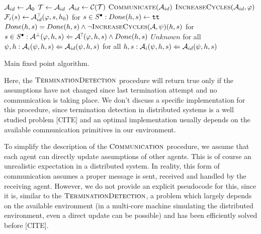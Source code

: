 \begin{algorithm}
	\begin{algorithmic}[1]
		\State $\mathcal{A}_{id} \gets \mathcal{A}_0$
		\Repeat
		\Repeat
		\Repeat
		\State $\mathcal{T} \gets \mathcal{A}_{id}$
		\State $\mathcal{A}_{id} \gets \mathcal{C}(\mathcal{T})$
		\State $\Call{Communicate}{\assume_{id}}$
		\State $\Call{IncreaseCycles}{\assume_{id}, \varphi}$
		\State $\mathcal{F}_i(s) \gets \mathcal{A}^\top_{id}(\varphi, s, h_0)$
		\EndFunction
			\State for $s \in \mathit{S}^\bullet : Done(h, s) \gets \texttt{tt} $
				\State $Done(h, s) = Done(h, s) \land \neg \Call{IncreaseCycles}{\mathcal{A}, \psi}(h, s)$
			\EndFor
			\State for $s \in \mathit{S}^\bullet : \mathcal{A}^\bot(\varphi, h, s) \Leftarrow \mathcal{A}^?(\varphi, h, s) \land Done(h,s)$
			\State \Return $Unknown$
		\EndFunction
					\State for all $\psi,h : \mathcal{A}_i(\psi, h, s) \Leftarrow \mathcal{A}_{id}(\psi, h, s)$
				\EndFor
					\State for all $h, s : \mathcal{A}_i(\psi, h, s) \Leftarrow \mathcal{A}_{id}(\psi, h, s)$
				\EndFor
			\EndFor
		\EndFunction
	\end{algorithmic}	

	\caption{Main fixed point algorithm.}
	\label{alg:main}
\end{algorithm}

Here, the $\textsc{TerminationDetection}$ procedure will return true only if the assumptions have not changed since last termination attempt and no communication is taking place. We don't discuss a specific implementation for this procedure, since termination detection in distributed systems is a well studied problem [CITE] and an optimal implementation usually depends on the available communication primitives in our environment.

To simplify the description of the $\textsc{Communication}$ procedure, we assume that each agent can directly update assumptions of other agents. This is of course an unrealistic expectation in a distributed system. In reality, this form of communication assumes a proper message is sent, received and handled by the receiving agent. However, we do not provide an explicit pseudocode for this, since it is, similar to the $\textsc{TerminationDetection}$, a problem which largely depends on the available environment (in a multi-core machine simulating the distributed environment, even a direct update can be possible) and has been efficiently solved before [CITE].


